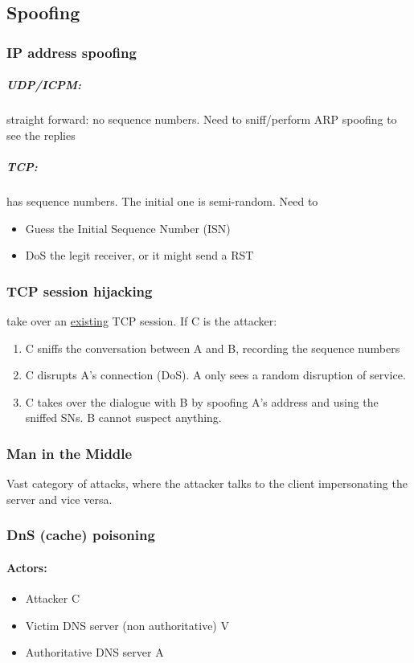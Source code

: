 \documentclass{article}
\begin{document}
\subsection{Spoofing}
\subsubsection{IP address spoofing}
\subparagraph{UDP/ICPM:} straight forward: no sequence numbers. Need to sniff/perform ARP spoofing to see the replies
\subparagraph{TCP:} has sequence numbers. The initial one is semi-random. Need to
\begin{itemize}
\item Guess the Initial Sequence Number (ISN)
\item DoS the legit receiver, or it might send a RST
\end{itemize}

\subsubsection{TCP session hijacking} take over an \underline{existing} TCP session. If C is the attacker:
\begin{enumerate}
\item C sniffs the conversation between A and B, recording the sequence numbers
\item C disrupts A's connection (DoS). A only sees a random disruption of service.
\item C takes over the dialogue with B by spoofing A's address and using the sniffed SNs. B cannot suspect anything.
\end{enumerate}

\subsubsection{Man in the Middle} Vast category of attacks, where the attacker talks to the client impersonating the server and vice versa.

\subsubsection{DnS (cache) poisoning}
\paragraph{Actors:}
\begin{itemize}
\item Attacker C
\item Victim DNS server (non authoritative) V
\item Authoritative DNS server A
\end{itemize}
\end{document}
